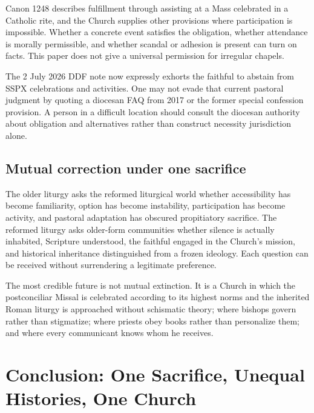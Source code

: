 Canon 1248 describes fulfillment through assisting at a Mass celebrated in a Catholic rite, and the Church supplies other provisions where participation is impossible. Whether a concrete event satisfies the obligation, whether attendance is morally permissible, and whether scandal or adhesion is present can turn on facts. This paper does not give a universal permission for irregular chapels.

The 2 July 2026 DDF note now expressly exhorts the faithful to abstain from SSPX celebrations and activities. One may not evade that current pastoral judgment by quoting a diocesan FAQ from 2017 or the former special confession provision. A person in a difficult location should consult the diocesan authority about obligation and alternatives rather than construct necessity jurisdiction alone.

\subsection{Mutual correction under one sacrifice}

The older liturgy asks the reformed liturgical world whether accessibility has become familiarity, option has become instability, participation has become activity, and pastoral adaptation has obscured propitiatory sacrifice. The reformed liturgy asks older-form communities whether silence is actually inhabited, Scripture understood, the faithful engaged in the Church's mission, and historical inheritance distinguished from a frozen ideology. Each question can be received without surrendering a legitimate preference.

The most credible future is not mutual extinction. It is a Church in which the postconciliar Missal is celebrated according to its highest norms and the inherited Roman liturgy is approached without schismatic theory; where bishops govern rather than stigmatize; where priests obey books rather than personalize them; and where every communicant knows whom he receives.


\section{Conclusion: One Sacrifice, Unequal Histories, One Church}

